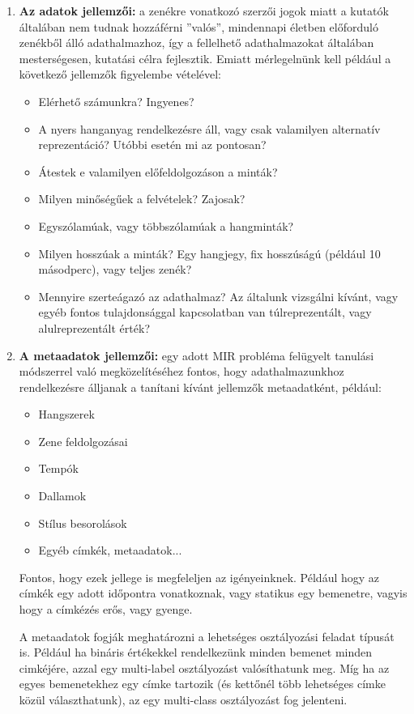 \begin{enumerate}
 \item \textbf{Az adatok jellemzői:} a zenékre vonatkozó szerzői jogok miatt a kutatók általában nem tudnak hozzáférni ''valós'', mindennapi életben előforduló zenékből álló adathalmazhoz, így a fellelhető adathalmazokat általában mesterségesen, kutatási célra fejlesztik. Emiatt mérlegelnünk kell például a következő jellemzők figyelembe vételével:
	 \begin{itemize}
	  \item Elérhető számunkra? Ingyenes?
	  \item A nyers hanganyag rendelkezésre áll, vagy csak valamilyen alternatív reprezentáció?  Utóbbi esetén mi az pontosan?
	  \item Átestek e valamilyen előfeldolgozáson a minták? 
	  \item Milyen minőségűek a felvételek? Zajosak?
	  \item Egyszólamúak, vagy többszólamúak a hangminták?
	  \item Milyen hosszúak a minták? Egy hangjegy, fix hosszúságú (például 10 másodperc), vagy teljes zenék?
	  \item Mennyire szerteágazó az adathalmaz? Az általunk vizsgálni kívánt, vagy egyéb fontos tulajdonsággal kapcsolatban van túlreprezentált, vagy alulreprezentált érték?
	 \end{itemize}
 \item \textbf{A metaadatok jellemzői:} egy adott MIR probléma felügyelt tanulási módszerrel való megközelítéséhez fontos, hogy adathalmazunkhoz rendelkezésre álljanak a tanítani kívánt jellemzők metaadatként, például:
	 \begin{itemize}
	  \item Hangszerek
	  \item Zene feldolgozásai
	  \item Tempók
	  \item Dallamok
	  \item Stílus besorolások
	  \item Egyéb címkék, metaadatok...
	 \end{itemize}
	 Fontos, hogy ezek jellege is megfeleljen az igényeinknek. Például hogy az címkék egy adott időpontra vonatkoznak, vagy statikus egy bemenetre, vagyis hogy a címkézés erős, vagy gyenge.
	 
	 A metaadatok fogják meghatározni a lehetséges osztályozási feladat típusát is. Például ha bináris értékekkel rendelkezünk minden bemenet minden cimkéjére, azzal egy multi-label osztályozást valósíthatunk meg. Míg ha az egyes bemenetekhez egy címke tartozik (és kettőnél több lehetséges címke közül választhatunk), az egy multi-class osztályozást fog jelenteni.
\end{enumerate}

